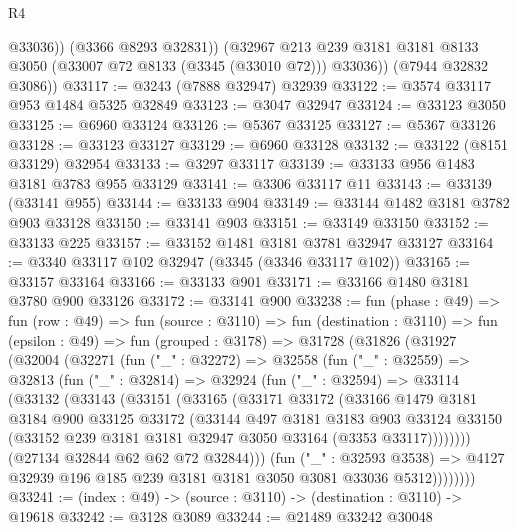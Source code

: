 \begin{lexlean}{R4}
\begin{coremodule}
              @33036))
          (@3366 @8293 @32831))
        (@32967 @213 @239 @3181 @3181 @8133 @3050 (@33007 @72 @8133 (@3345 (@33010 @72))) @33036))
      (@7944 @32832 @3086))
@33117 := @3243 (@7888 @32947) @32939
@33122 := @3574 @33117 @953 @1484 @5325 @32849
@33123 := @3047 @32947
@33124 := @33123 @3050
@33125 := @6960 @33124
@33126 := @5367 @33125
@33127 := @5367 @33126
@33128 := @33123 @33127
@33129 := @6960 @33128
@33132 := @33122 (@8151 @33129) @32954
@33133 := @3297 @33117
@33139 := @33133 @956 @1483 @3181 @3783 @955 @33129
@33141 := @3306 @33117 @11
@33143 := @33139 (@33141 @955)
@33144 := @33133 @904
@33149 := @33144 @1482 @3181 @3782 @903 @33128
@33150 := @33141 @903
@33151 := @33149 @33150
@33152 := @33133 @225
@33157 := @33152 @1481 @3181 @3781 @32947 @33127
@33164 := @3340 @33117 @102 @32947 (@3345 (@3346 @33117 @102))
@33165 := @33157 @33164
@33166 := @33133 @901
@33171 := @33166 @1480 @3181 @3780 @900 @33126
@33172 := @33141 @900
@33238 := fun (phase : @49) =>
  fun (row : @49) =>
  fun (source : @3110) =>
  fun (destination : @3110) =>
  fun (epsilon : @49) =>
  fun (grouped : @3178) =>
  @31728
    (@31826
      (@31927
        (@32004
          (@32271
            (fun ("_" : @32272) =>
            @32558
              (fun ("_" : @32559) =>
              @32813
                (fun ("_" : @32814) =>
                @32924
                  (fun ("_" : @32594) =>
                  @33114
                    (@33132
                      (@33143
                        (@33151
                          (@33165
                            (@33171
                              @33172
                              (@33166
                                @1479
                                @3181
                                @3184
                                @900
                                @33125
                                @33172
                                (@33144
                                  @497
                                  @3181
                                  @3183
                                  @903
                                  @33124
                                  @33150
                                  (@33152 @239 @3181 @3181 @32947 @3050 @33164 (@3353 @33117))))))))
                      (@27134 @32844 @62 @62 @72 @32844)))
                  (fun ("_" : @32593 @3538) =>
                  @4127 @32939 @196 @185 @239 @3181 @3181 @3050 @3081 @33036 @5312))))))))
@33241 := (index : @49) -> (source : @3110) -> (destination : @3110) -> @19618
@33242 := @3128 @3089
@33244 := @21489 @33242 @30048

\end{coremodule}
\end{lexlean}
